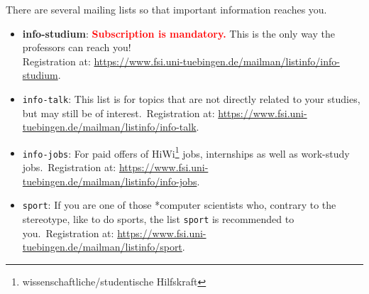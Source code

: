 There are several mailing lists so that important information reaches you. 
\begin{itemize}
	\item \textbf{info-studium}: \textcolor{red}{\textbf{Subscription is mandatory.}} This is the only way the professors can reach you! \\
	Registration at: \url{https://www.fsi.uni-tuebingen.de/mailman/listinfo/info-studium}.
	\item \texttt{info-talk}: This list is for topics that are not directly related to your studies, but may still be of interest.\
	Registration at: \url{https://www.fsi.uni-tuebingen.de/mailman/listinfo/info-talk}.
	\item \texttt{info-jobs}: For paid offers of HiWi\footnote{wissenschaftliche/studentische Hilfskraft} jobs, internships as well as work-study jobs.\
	Registration at: \url{https://www.fsi.uni-tuebingen.de/mailman/listinfo/info-jobs}.
	\item \texttt{sport}: If you are one of those *computer scientists who, contrary to the stereotype, like to do sports, the list \texttt{sport} is recommended to you.\
	Registration at: \url{https://www.fsi.uni-tuebingen.de/mailman/listinfo/sport}. 
\end{itemize}
